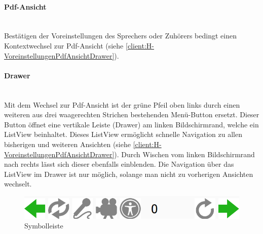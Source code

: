 \paragraph{Pdf-Ansicht}$\;$\\
Bestätigen der Voreinstellungen des Sprechers oder Zuhörers bedingt einen Kontextwechsel zur Pdf-Ansicht (siehe \autoref{client:H-VoreinstellungenPdfAnsichtDrawer}).
\paragraph{Drawer}$\;$\\
Mit dem Wechsel zur Pdf-Ansicht ist der grüne Pfeil oben links durch einen weiteren aus drei waagerechten Strichen bestehenden Menü-Button ersetzt. Dieser Button öffnet eine vertikale Leiste (Drawer) am linken Bildschirmrand, welche ein ListView beinhaltet. Dieses ListView ermöglicht schnelle Navigation zu allen bisherigen und weiteren Ansichten (siehe \autoref{client:H-VoreinstellungenPdfAnsichtDrawer}). Durch Wischen vom linken Bildschirmrand nach rechts lässt sich dieser ebenfalls einblenden. Die Navigation über das ListView im Drawer ist nur möglich, solange man nicht zu vorherigen Ansichten wechselt.

\begin{figure}[ht!]
	\centering
	\includegraphics[scale=0.5]{GUI/Bilder/SchnellLeiste.PNG}
	\caption{Symbolleiste{\tiny}}
	\label{client:Symbolleiste}
\end{figure}

